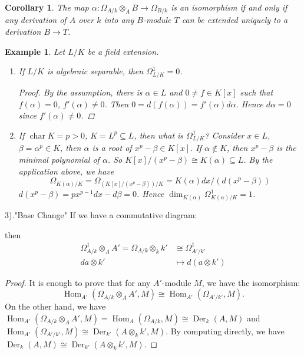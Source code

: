 \documentclass[cs4size]{article}
\newcommand{\su}{\subseteq}
\newcommand{\ra}{\rightarrow}
\DeclareMathOperator{\Der}{Der}
\DeclareMathOperator{\Hom}{Hom}
\DeclareMathOperator{\chara}{char}
\newtheorem{cor}{Corollary}
\newtheorem{ex}{Example}
\begin{document}
\begin{cor}
The map $\alpha: \Omega_{A/k}\otimes_AB\ra \Omega_{B/k}$ is an isomorphism if and only if any derivation of $A$ over $k$ into any $B$-module $T$ can be extended uniquely to a derivation $B\ra T$.
\end{cor}

\begin{ex}
Let $L/K$ be a field extension.
\begin{enumerate}
\item If $L/K$ is algebraic separable, then $\Omega_{L/K}^1=0$.
\begin{proof}
By the assumption, there is $\alpha\in L$ and $0\neq f\in K[x]$ such that $f(\alpha)=0$, $f'(\alpha)\neq 0$. Then $0=d(f(\alpha))=f'(\alpha)d\alpha$. Hence $d\alpha=0$ since $f'(\alpha)\neq0$.
\end{proof}
\item If $\chara K=p>0$, $K=L^p\su L$, then what is $\Omega_{L/K}^1$? Consider $x\in L$, $\beta=\alpha^p\in K$, then $\alpha$ is a root of $x^p-\beta\in K[x]$. If $\alpha\notin K$, then $x^p-\beta$ is the minimal polynomial of $\alpha$. So $K[x]/(x^p-\beta)\cong K(\alpha)\su L$. By the application above, we have
    \[\Omega_{K(\alpha)/K}=\Omega_{(K[x]/(x^p-\beta))/K}=K(\alpha)dx/(d(x^p-\beta))\]
    $d(x^p-\beta)=px^{p-1}dx-d\beta=0$. Hence $\dim_{K(\alpha)}\Omega_{K(\alpha)/K}^1=1$.
\end{enumerate}
\end{ex}

3)."Base Change"
If we have a commutative diagram:
\begin{center}
\end{center}
then
\begin{align*}
\Omega_{A/k}^1\otimes_AA'=\Omega_{A/k}\otimes_kk'&\cong \Omega_{A'/k'}^1\\
da\otimes k'&\mapsto d(a\otimes k')
\end{align*}
\begin{proof}
It is enough to prove that for any $A'$-module $M$, we have the isomorphism: \[\Hom_{A'}(\Omega_{A/k}\otimes_AA',M)\cong \Hom_{A'}(\Omega_{A'/k'},M).\]
On the other hand, we have $\Hom_{A'}(\Omega_{A/k}\otimes_AA',M)=\Hom_A(\Omega_{A/k},M)\cong \Der_k(A,M)$ and $\Hom_{A'}(\Omega_{A'/k'},M)\cong \Der_{k'}(A\otimes_kk', M)$. By computing directly, we have $\Der_k(A,M)\cong\Der_{k'}(A\otimes_kk', M)$.
\end{proof}
\end{document}
